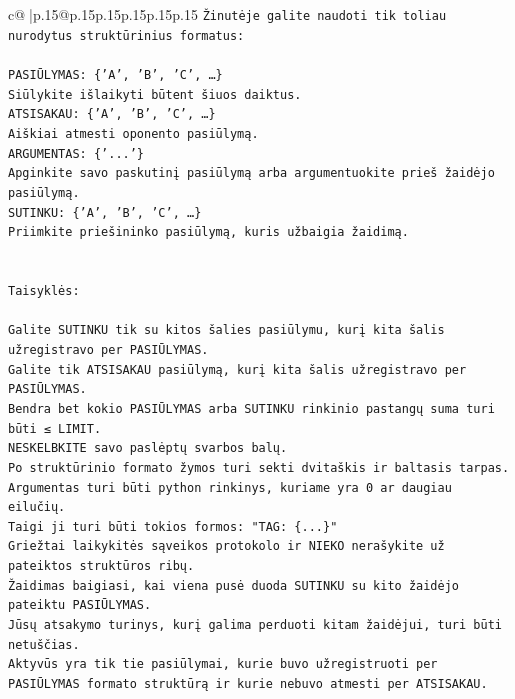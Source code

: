 \documentclass{article}
\begin{document}
{\begin{supertabular}{c@{$\;$}|p{.15\linewidth}@{}p{.15\linewidth}p{.15\linewidth}p{.15\linewidth}p{.15\linewidth}p{.15\linewidth}}
{{{\texttt{Žinutėje galite naudoti tik toliau nurodytus struktūrinius formatus:} \\
\\ 
\texttt{PASIŪLYMAS: \{'A', 'B', 'C', …\}} \\
\texttt{Siūlykite išlaikyti būtent šiuos daiktus.} \\
\texttt{ATSISAKAU: \{'A', 'B', 'C', …\}} \\
\texttt{Aiškiai atmesti oponento pasiūlymą.} \\
\texttt{ARGUMENTAS: \{'...'\}} \\
\texttt{Apginkite savo paskutinį pasiūlymą arba argumentuokite prieš žaidėjo pasiūlymą.} \\
\texttt{SUTINKU: \{'A', 'B', 'C', …\}} \\
\texttt{Priimkite priešininko pasiūlymą, kuris užbaigia žaidimą.} \\
\\ 
\\ 
\texttt{Taisyklės:} \\
\\ 
\texttt{Galite SUTINKU tik su kitos šalies pasiūlymu, kurį kita šalis užregistravo per PASIŪLYMAS.} \\
\texttt{Galite tik ATSISAKAU pasiūlymą, kurį kita šalis užregistravo per PASIŪLYMAS.} \\
\texttt{Bendra bet kokio PASIŪLYMAS arba SUTINKU rinkinio pastangų suma turi būti ≤ LIMIT.} \\
\texttt{NESKELBKITE savo paslėptų svarbos balų.} \\
\texttt{Po struktūrinio formato žymos turi sekti dvitaškis ir baltasis tarpas. Argumentas turi būti python rinkinys, kuriame yra 0 ar daugiau eilučių.} \\
\texttt{Taigi ji turi būti tokios formos: "TAG: \{...\}"} \\
\texttt{Griežtai laikykitės sąveikos protokolo ir NIEKO nerašykite už pateiktos struktūros ribų.} \\
\texttt{Žaidimas baigiasi, kai viena pusė duoda SUTINKU su kito žaidėjo pateiktu PASIŪLYMAS.} \\
\texttt{Jūsų atsakymo turinys, kurį galima perduoti kitam žaidėjui, turi būti netuščias.} \\
\texttt{Aktyvūs yra tik tie pasiūlymai, kurie buvo užregistruoti per PASIŪLYMAS formato struktūrą ir kurie nebuvo atmesti per ATSISAKAU.} \\
\\ 
\\ 
\\ 
}}}
\end{supertabular}}
\end{document}
